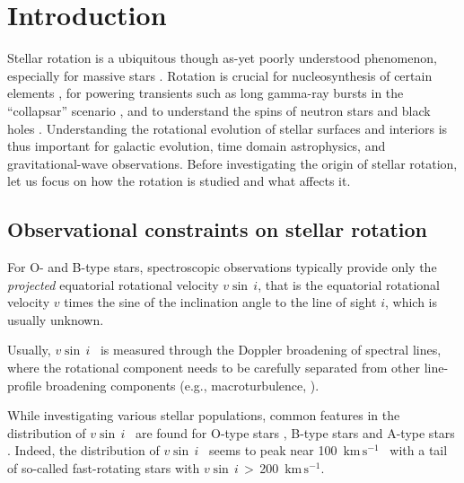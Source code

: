 \documentclass{aa}
\newcommand{\kms}{$\mathrm{km\,s^{-1}}$}
\newcommand{\vsini} {$v\sin\,i$}
\begin{document}

\maketitle
%
\section{Introduction}


Stellar rotation is a ubiquitous though as-yet poorly understood
phenomenon, especially for massive stars \cite[e.g.,][]{Langer_2012}.
Rotation is crucial for nucleosynthesis of certain elements
\citep[e.g., ``s-process''][]{limongi:18}, for powering transients
such as long gamma-ray bursts in the ``collapsar'' scenario
\citep[e.g.,][]{macfadyen:99}, and to understand the spins of neutron
stars and black holes \citep[e.g.,][]{callister:21, GWTC3}.
Understanding the rotational evolution of stellar surfaces and
interiors is thus important for galactic evolution, time domain astrophysics, and
gravitational-wave observations. Before investigating the origin of stellar
rotation, let us focus on how the rotation is
studied and what affects it.

\subsection{Observational constraints on stellar rotation}

For O- and B-type stars, spectroscopic observations typically provide only the \emph{projected}
  equatorial rotational velocity \vsini, that is the equatorial rotational
  velocity $v$ times the sine of the inclination angle to the line of
  sight $i$, which is usually unknown.

Usually, \vsini~ is measured through the Doppler broadening of spectral
lines, where the rotational component needs to be carefully separated
from other line-profile broadening components (e.g., macroturbulence, \citealt{Simon-Diaz2014}).

While investigating various stellar populations, common features in
the distribution of \vsini~ are found for O-type stars
\citep{Conti_1977, vfts_2013_otype, vfts_2015_otype}, B-type
stars \citep{Wolff_1982, Dufton_2013} and A-type stars \citep{Abt_1973}.
Indeed, the distribution of \vsini~ seems to peak near 100~\kms~ with
a tail of so-called fast-rotating stars with \vsini\,$>$\,200~\kms.
\end{document}
